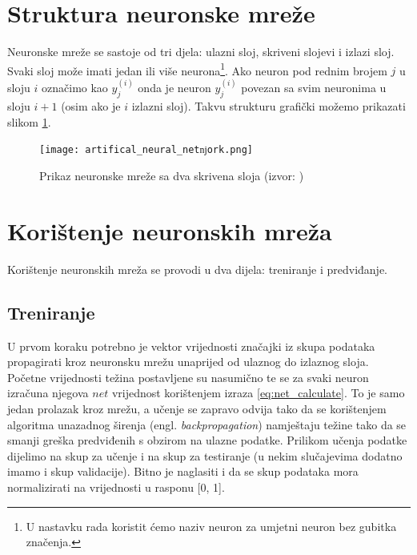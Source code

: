 \documentclass[times, utf8, zavrsni]{fer}
\begin{document}
\section{Struktura neuronske mreže}
Neuronske mreže se sastoje od tri djela: ulazni sloj, skriveni slojevi i izlazi sloj. Svaki sloj može imati jedan ili više neurona\footnote{U nastavku rada koristit ćemo naziv neuron za umjetni neuron bez gubitka značenja.}. Ako neuron pod rednim brojem $j$ u sloju $i$ označimo kao $y_{j}^{(i)}$ onda je neuron $y_{j}^{(i)}$ povezan sa svim neuronima u sloju $i+1$ (osim ako je $i$ izlazni sloj). Takvu strukturu grafički možemo prikazati slikom \ref{fig:artifical_neural_network}.

\begin{figure}[htb!]
\centering
\texttt{[image: artifical\_neural\_netǌork.png]}
\caption{Prikaz neuronske mreže sa dva skrivena sloja (izvor: \cite{cupic2018unm})}
\label{fig:artifical_neural_network}
\end{figure}


\section{Korištenje neuronskih mreža}
Korištenje neuronskih mreža se provodi u dva dijela: treniranje i predviđanje. 

\subsection{Treniranje}
U prvom koraku potrebno je vektor vrijednosti značajki iz skupa podataka propagirati kroz neuronsku mrežu unaprijed od ulaznog do izlaznog sloja. Početne vrijednosti težina postavljene su nasumično te se za svaki neuron izračuna njegova $net$ vrijednost korištenjem izraza \ref{eq:net_calculate}. To je samo jedan prolazak kroz mrežu, a učenje se zapravo odvija tako da se korištenjem algoritma unazadnog širenja (engl. \textit{backpropagation}) namještaju težine tako da se smanji greška predviđenih s obzirom na ulazne podatke. Prilikom učenja podatke dijelimo na skup za učenje i na skup za testiranje (u nekim slučajevima dodatno imamo i skup validacije). Bitno je naglasiti i da se skup podataka mora normalizirati na vrijednosti u rasponu [0, 1].
\end{document}
